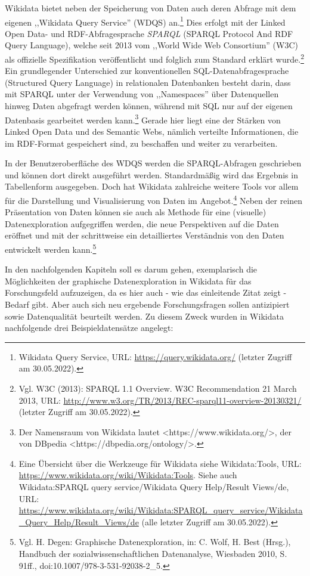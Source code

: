 Wikidata bietet neben der Speicherung von Daten auch deren Abfrage mit dem eigenen ,,Wikidata Query Service'' (WDQS) an.\footnote{Wikidata Query Service, URL: \url{https://query.wikidata.org/} (letzter Zugriff am 30.05.2022).} Dies erfolgt mit der Linked Open Data- und RDF-Abfragesprache \textit{SPARQL} (SPARQL Protocol And RDF Query Language), welche seit 2013 vom ,,World Wide Web Consortium'' (W3C) als offizielle Spezifikation veröffentlicht und folglich zum Standard erklärt wurde.\footnote{Vgl. W3C (2013): SPARQL 1.1 Overview. W3C Recommendation 21 March 2013, URL: \url{http://www.w3.org/TR/2013/REC-sparql11-overview-20130321/} (letzter Zugriff am 30.05.2022).} Ein grundlegender Unterschied zur konventionellen SQL-Datenabfragesprache (Structured Query Language) in relationalen Datenbanken besteht darin, dass mit SPARQL unter der Verwendung von ,,Namespaces'' über Datenquellen hinweg Daten abgefragt werden können, während mit SQL nur auf der eigenen Datenbasis gearbeitet werden kann.\footnote{Der Namensraum von Wikidata lautet <https://www.wikidata.org/>, der von DBpedia <https://dbpedia.org/ontology/>.} Gerade hier liegt eine der Stärken von Linked Open Data und des Semantic Webs, nämlich verteilte Informationen, die im RDF-Format gespeichert sind, zu beschaffen und  weiter zu verarbeiten. 

In der Benutzeroberfläche des WDQS werden die SPARQL-Abfragen geschrieben und können dort direkt ausgeführt werden. Standardmäßig wird das Ergebnis in Tabellenform ausgegeben. Doch hat Wikidata zahlreiche weitere Tools vor allem für die Darstellung und Visualisierung von Daten im Angebot.\footnote{Eine Übersicht über die Werkzeuge für Wikidata siehe Wikidata:Tools, URL: \url{https://www.wikidata.org/wiki/Wikidata:Tools}. Siehe auch Wikidata:SPARQL query service/Wikidata Query Help/Result Views/de, URL: \url{https://www.wikidata.org/wiki/Wikidata:SPARQL_query_service/Wikidata_Query_Help/Result_Views/de} (alle letzter Zugriff am 30.05.2022).} Neben der reinen Präsentation von Daten können sie auch als Methode für eine (visuelle) Datenexploration aufgegriffen werden, die neue Perspektiven auf die Daten eröffnet und mit der schrittweise ein detailliertes Verständnis von den Daten entwickelt werden kann.\footnote{Vgl. H. Degen: Graphische Datenexploration, in: C. Wolf, H. Best (Hrsg.), Handbuch der sozialwissenschaftlichen Datenanalyse, Wiesbaden 2010, S. 91ff., doi:10.1007/978-3-531-92038-2\_5.} 

In den nachfolgenden Kapiteln soll es darum gehen, exemplarisch die Möglichkeiten der graphische Datenexploration in Wikidata für das Forschungsfeld aufzuzeigen, da es hier auch - wie das einleitende Zitat zeigt - Bedarf gibt. Aber auch sich neu ergebende Forschungsfragen sollen antizipiert sowie Datenqualität beurteilt werden. Zu diesem Zweck wurden in Wikidata nachfolgende drei Beispieldatensätze angelegt:

